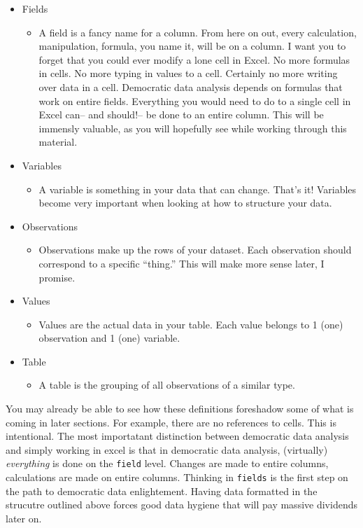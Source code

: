 \documentclass[]{book}
\providecommand{\tightlist}{%
  \setlength{\itemsep}{0pt}\setlength{\parskip}{0pt}}
\begin{document}
\begin{itemize}
\tightlist
\item
  Fields

  \begin{itemize}
  \tightlist
  \item
    A field is a fancy name for a column. From here on out, every calculation, manipulation, formula, you name it, will be on a column. I want you to forget that you could ever modify a lone cell in Excel. No more formulas in cells. No more typing in values to a cell. Certainly no more writing over data in a cell. Democratic data analysis depends on formulas that work on entire fields. Everything you would need to do to a single cell in Excel can-- and should!-- be done to an entire column. This will be immensly valuable, as you will hopefully see while working through this material.
  \end{itemize}
\item
  Variables

  \begin{itemize}
  \tightlist
  \item
    A variable is something in your data that can change. That's it! Variables become very important when looking at how to structure your data.
  \end{itemize}
\item
  Observations

  \begin{itemize}
  \tightlist
  \item
    Observations make up the rows of your dataset. Each observation should correspond to a specific ``thing.'' This will make more sense later, I promise.
  \end{itemize}
\item
  Values

  \begin{itemize}
  \tightlist
  \item
    Values are the actual data in your table. Each value belongs to 1 (one) observation and 1 (one) variable.
  \end{itemize}
\item
  Table

  \begin{itemize}
  \tightlist
  \item
    A table is the grouping of all observations of a similar type.
  \end{itemize}
\end{itemize}

You may already be able to see how these definitions foreshadow some of what is coming in later sections. For example, there are no references to cells. This is intentional. The most importatant distinction between democratic data analysis and simply working in excel is that in democratic data analysis, (virtually) \emph{everything} is done on the \texttt{field} level. Changes are made to entire columns, calculations are made on entire columns. Thinking in \texttt{fields} is the first step on the path to democratic data enlightement. Having data formatted in the strucutre outlined above forces good data hygiene that will pay massive dividends later on.
\end{document}
